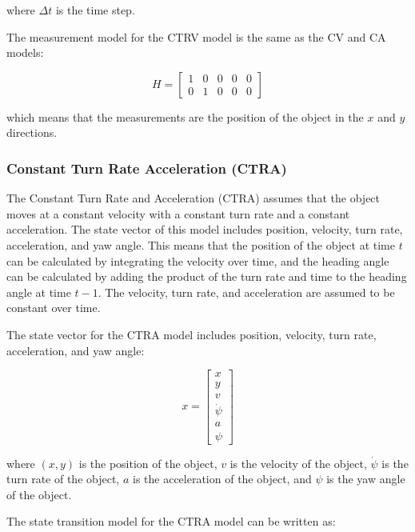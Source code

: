 where $\Delta t$ is the time step.

The measurement model for the CTRV model is the same as the CV and CA models:

\begin{equation}
	H = \begin{bmatrix}
		1 & 0 & 0 & 0 & 0 \\ 
		0 & 1 & 0 & 0 & 0
	\end{bmatrix}
\end{equation}

which means that the measurements are the position of the object in the $x$ and $y$ directions.

\subsubsection{Constant Turn Rate Acceleration (CTRA)}
\label{subsubsec:3_CTRA}

The Constant Turn Rate and Acceleration (CTRA) assumes that the object moves at a constant velocity with a constant turn rate and a constant acceleration. The state vector of this model includes position, velocity, turn rate, acceleration, and yaw angle. This means that the position of the object at time $t$ can be calculated by integrating the velocity over time, and the heading angle can be calculated by adding the product of the turn rate and time to the heading angle at time $t-1$. The velocity, turn rate, and acceleration are assumed to be constant over time.

The state vector for the CTRA model includes position, velocity, turn rate, acceleration, and yaw angle:

\begin{equation}
	x = \begin{bmatrix}
		x \\ 
		y \\ 
		v \\ 
		\dot{\psi} \\ 
		a \\ 
		\psi
	\end{bmatrix}
\end{equation}

where $(x,y)$ is the position of the object, $v$ is the velocity of the object, $\dot{\psi}$ is the turn rate of the object, $a$ is the acceleration of the object, and $\psi$ is the yaw angle of the object.

The state transition model for the CTRA model can be written as:


